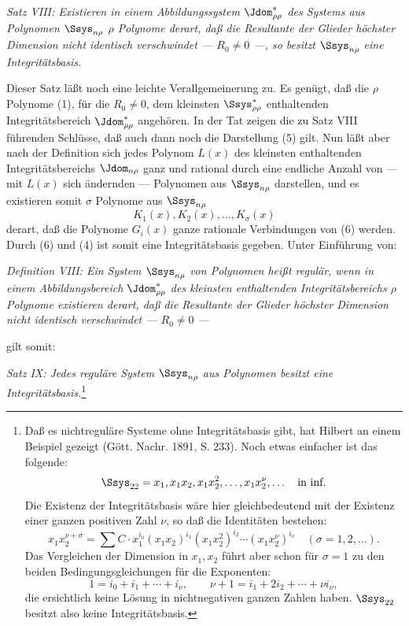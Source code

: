 \documentclass[11pt]{article}
\begin{document}
\emph{Satz VIII: Existieren in einem Abbildungssystem $\Jdom^*_{\rho\rho}$ des Systems aus Polynomen $\Ssys_{n\rho}$ $\rho$ Polynome derart, daß die Resultante der Glieder höchster Dimension nicht identisch verschwindet --- $R_0\ne0$ ---, so besitzt $\Ssys_{n\rho}$ eine Integritätsbasis.}

Dieser Satz läßt noch eine leichte Verallgemeinerung zu. Es genügt, daß die $\rho$ Polynome (1), für die $R_0\ne0$, dem kleinsten $\Ssys^*_{\rho\rho}$ enthaltenden Integritätsbereich $\Jdom^*_{\rho\rho}$ angehören. In der Tat zeigen die zu Satz VIII führenden Schlüsse, daß auch dann noch die Darstellung (5) gilt. Nun läßt aber nach der Definition sich jedes Polynom $L(x)$ des kleinsten enthaltenden Integritätsbereichs $\Jdom_{n\rho}$ ganz und rational durch eine endliche Anzahl von --- mit $L(x)$ sich ändernden --- Polynomen aus $\Ssys_{n\rho}$ darstellen, und es existieren somit $\sigma$ Polynome aus $\Ssys_{n\rho}$
\begin{equation}
  K_1(x),K_2(x),\ldots,K_\sigma(x)
\tag{6}
\end{equation}
derart, daß die Polynome $G_i(x)$ ganze rationale Verbindungen von (6) werden. Durch (6) und (4) ist somit eine Integritätsbasis gegeben. Unter Einführung von:

\emph{Definition VIII: Ein System $\Ssys_{n\rho}$ von Polynomen heißt regulär, wenn in einem Abbildungsbereich $\Jdom^*_{\rho\rho}$ des kleinsten enthaltenden Integritätsbereichs $\rho$ Polynome existieren derart, daß die Resultante der Glieder höchster Dimension nicht identisch verschwindet --- $R_0\ne0$ ---}

gilt somit:

\emph{Satz IX: Jedes reguläre System $\Ssys_{n\rho}$ aus Polynomen besitzt eine Integritätsbasis.}\footnote{Daß es nichtreguläre Systeme ohne Integritätsbasis gibt, hat Hilbert an einem Beispiel gezeigt (Gött. Nachr. 1891, S. 233). Noch etwas einfacher ist das folgende:
\[
  \Ssys_{22}=x_1,
  x_1x_2,
  x_1x_2^2,
  \ldots,
  x_1x_2^\nu,
  \ldots\quad\text{in inf.}
\]
Die Existenz der Integritätsbasis wäre hier gleichbedeutend mit der Existenz einer ganzen positiven Zahl $\nu$, so daß die Identitäten bestehen:
\[
  x_1x_2^{\nu+\sigma}=\sum C\cdot x_1^{i_0}(x_1x_2)^{i_1}(x_1x_2^2)^{i_2}\cdots(x_1x_2^\nu)^{i_\nu}
  \quad(\sigma=1,2,\ldots).
\]
Das Vergleichen der Dimension in $x_1,x_2$ führt aber schon für $\sigma=1$ zu den beiden Bedingungsgleichungen für die Exponenten:
\[
  1=i_0+i_1+\cdots+i_\nu,
  \qquad
  \nu+1=i_1+2i_2+\cdots+\nu i_\nu,
\]
die ersichtlich keine Lösung in nichtnegativen ganzen Zahlen haben. $\Ssys_{22}$ besitzt also keine Integritätsbasis.}
\end{document}
